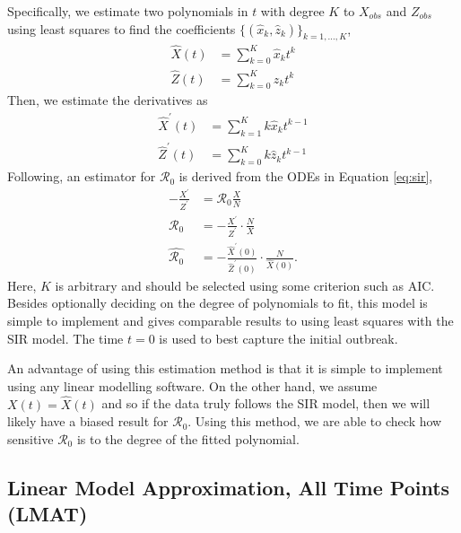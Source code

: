 \documentclass[12pt]{article}
\newcommand{\rr}{\ensuremath{\mathcal{R}_0}}
\begin{document}
Specifically, we estimate two polynomials in \(t\) with degree $K$  to \(X_{obs}\)
and \(Z_{obs}\) using least squares to find the coefficients $\{(\hat{x}_k,
\hat{z}_k)\}_{k=1, \dots, K}$,
\begin{align*}
\hat{X}(t) &= \sum_{k=0}^K \hat{x}_k t^k\\
{\hat{Z}}(t) &= \sum_{k=0}^K \hat{z}_k t^k
\end{align*}
Then, we estimate the derivatives as
\begin{align*}
\hat{X}^\prime(t) &= \sum_{k=1}^K k \hat{x}_k t^{k-1}\\
\hat{Z}^\prime(t) &= \sum_{k=0}^K k \hat{z}_k t^{k-1}
\end{align*}
Following,  an estimator for \(\rr\) is derived from the ODEs in Equation \eqref{eq:sir},
\begin{align}
  - \frac{X^\prime}{Z^\prime}&= \rr \frac{X}{N} \nonumber\\
  \rr &=       -\frac{X^\prime}{
        Z^\prime} \cdot \frac{N}{X} \nonumber\\
  \hat{\rr} &= -\frac{\hat{X}^\prime(0)}{ \hat{Z}^\prime(0)} \cdot \frac{N}{\hat{X}(0)}. \nonumber
  \end{align}
  Here, $K$ is arbitrary and should be selected using some criterion such as AIC.  Besides optionally deciding on the degree of polynomials to fit, this model is simple to implement and gives comparable results to using least squares with the SIR model.  The time $t=0$ is used to best capture the initial outbreak.

  An advantage of using this estimation method is that it is simple to implement using any linear modelling software.  On the other hand, we assume $X(t) = \hat{X}(t)$ and so if the data truly follows the SIR model, then we will likely have a biased result for $\rr$.  Using this method, we are able to check how sensitive $\rr$ is to the degree of the fitted polynomial.

\subsection{Linear Model Approximation, All Time Points (LMAT)}\label{linear-model-approximation-all-time-points-degree-10}
\end{document}
